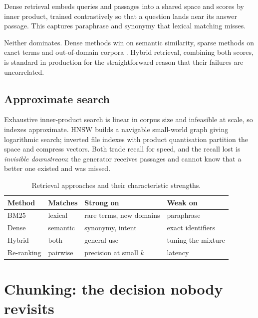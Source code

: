\documentclass[11pt,a4paper]{article}
\begin{document}
Dense retrieval \cite{karpukhin2020} embeds queries and passages into a shared
space and scores by inner product, trained contrastively so that a question
lands near its answer passage. This captures paraphrase and synonymy that
lexical matching misses.

Neither dominates. Dense methods win on semantic similarity, sparse methods on
exact terms and out-of-domain corpora \cite{thakur2021}. Hybrid retrieval,
combining both scores, is standard in production for the straightforward
reason that their failures are uncorrelated.

\subsection{Approximate search}

Exhaustive inner-product search is linear in corpus size and infeasible at
scale, so indexes approximate. HNSW \cite{malkov2020} builds a navigable
small-world graph giving logarithmic search; inverted file indexes with
product quantisation \cite{johnson2019} partition the space and compress
vectors. Both trade recall for speed, and the recall lost is
\emph{invisible downstream}: the generator receives passages and cannot know
that a better one existed and was missed.

\begin{table}[htbp]
  \centering
  \caption{Retrieval approaches and their characteristic strengths.}
  \label{tab:retrieval}
  \begin{tabular}{llll}
    \toprule
    \textbf{Method} & \textbf{Matches} & \textbf{Strong on} & \textbf{Weak on} \\
    \midrule
    BM25 \cite{robertson2009}      & lexical  & rare terms, new domains & paraphrase \\
    Dense \cite{karpukhin2020}     & semantic & synonymy, intent        & exact identifiers \\
    Hybrid                          & both     & general use             & tuning the mixture \\
    Re-ranking \cite{nogueira2019} & pairwise & precision at small $k$  & latency \\
    \bottomrule
  \end{tabular}
\end{table}

\section{Chunking: the decision nobody revisits}
\label{sec:chunking}
\end{document}
